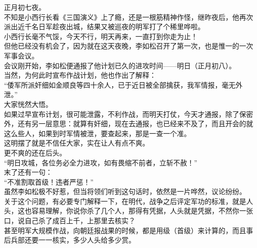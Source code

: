 \begin{multicols}{\theparacolNo}
正月初七夜。\\

不知是小西行长看《三国演义》上了瘾，还是一根筋精神作怪，继昨夜后，他再次派出近千名日军趁夜出城，结果又被巡夜的明军打了个稀里哗啦。\\

小西行长毫不气馁，今天不行，明天再来，一直打到你走为止！\\

但他已经没有机会了，因为就在这天夜晚，李如松召开了第一次，也是惟一的一次军事会议。\\

会议刚开始，李如松便通报了他计划已久的进攻时间——明日（正月初八）。\\

当然，为何此时宣布作战计划，他也作出了解释：\\

“倭军所派奸细如金顺良等四十余人，已于近日被全部擒获，我军情报，毫无外泄。”\\

大家恍然大悟。\\

如果过早宣布计划，很可能泄露，不利作战，而明天打仗，今天才通报，除了保密外，还有另一层意思：就算有奸细，现在去通报，也已经来不及了，而且开会的就这么些人，如果到时军情被泄，要查起来，那是一查一个准。\\

这明摆了就是不信任大家，实在让人有点不爽。\\

更不爽的还在后头。\\

“明日攻城，各位务必全力进攻，如有畏缩不前者，立斩不赦！”\\

末了还有一句：\\

“不准割取首级！违者严惩！”\\

虽然李如松极不好惹，但当将领们听到这句话时，依然是一片哗然，议论纷纷。\\

关于这个问题，有必要专门解释一下，在明代，战争之后评定军功的标准，就是人头，这也容易理解，你说你杀了几个人，那得有凭据，人头就是凭据，不然你一张口，说自己杀了成百上千，上那里去核实？\\

甚至明军大规模作战，向朝廷报战果的时候，都是用级（首级）来计算的，而且事后兵部还要一一核实，多少人头给多少赏。\\


\end{multicols}
